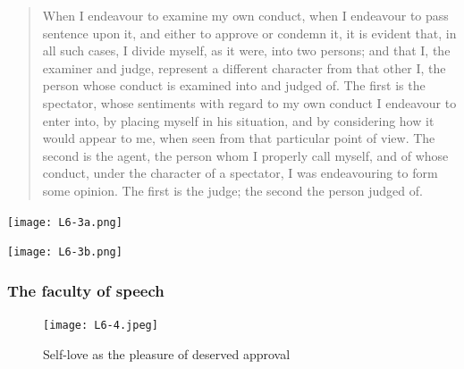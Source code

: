             \begin{quote}
                When I endeavour to examine my own conduct, when I endeavour to pass sentence upon it, and either to approve or condemn it, it is evident that, in all such cases, I divide myself, as it were, into two persons; and that I, the examiner and judge, represent a different character from that other I, the person whose conduct is examined into and judged of. The first is the spectator, whose sentiments with regard to my own conduct I endeavour to enter into, by placing myself in his situation, and by considering how it would appear to me, when seen from that particular point of view. The second is the agent, the person whom I properly call myself, and of whose conduct, under the character of a spectator, I was endeavouring to form some opinion. The first is the judge; the second the person judged of.
            \end{quote}

            \begin{minipage}{0.48\textwidth}
                \begin{center}
                    \texttt{[image: L6-3a.png]}
                \end{center}
            \end{minipage}
            \begin{minipage}{0.04\textwidth}
                
            \end{minipage}
            \begin{minipage}{0.48\textwidth}
                \begin{center}
                    \texttt{[image: L6-3b.png]}
                \end{center}
            \end{minipage}


\newpage
        \subsubsection{The faculty of speech}

            \begin{figure}[h]
                \centering
                \texttt{[image: L6-4.jpeg]}
                \caption{Self-love as the pleasure of  deserved approval}
                \label{fig:enter-label}
            \end{figure}

